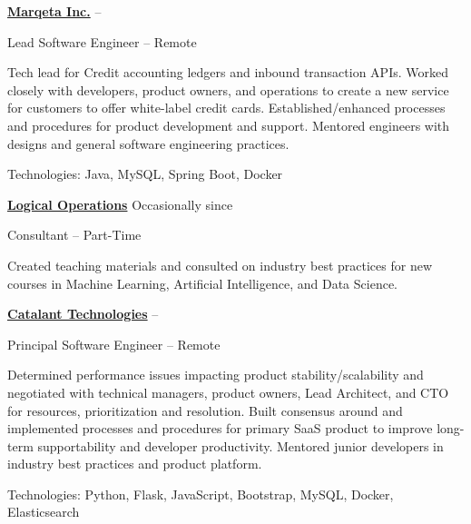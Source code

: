 \documentclass[letterpaper,MMMMyyyy,nonstopmode]{simpleresumecv}
\newif\ifLOCATION
\begin{document}
\begin{Body}
\BigGap
\Entry
\href{https://www.marqeta.com}
{\textbf{Marqeta Inc.}}
\hfill
 -- 

Lead Software Engineer -- Remote
\ifLOCATION
\hfill
Rochester, New York
\fi

\begin{Detail}
\BulletItem
Tech lead for Credit accounting ledgers and inbound transaction APIs.
Worked closely with developers, product owners, and operations to create a new service for customers to offer white-label credit cards. 
\BulletItem
Established/enhanced processes and procedures for product development and support.
\BulletItem
Mentored engineers with designs and general software engineering practices.

\Gap
Technologies: Java, MySQL, Spring Boot, Docker

\end{Detail}

\BigGap

\Entry
\href{http://logicalopertions.com/}
{\textbf{Logical Operations}}
\hfill
Occasionally since 

Consultant -- Part-Time
\ifLOCATION
\hfill 
Rochester, New York
\fi

\begin{Detail}
\BulletItem
Created teaching materials and consulted on industry best practices for new courses in Machine Learning, Artificial Intelligence, and Data Science.
\end{Detail}

\BigGap

\Entry
\href{http://www.gocatalant.com}
{\textbf{Catalant Technologies}}
\hfill
 -- 

Principal Software Engineer -- Remote
\ifLOCATION
\hfill
Rochester, New York
\fi

\begin{Detail}
\BulletItem
Determined performance issues impacting product stability/scalability and negotiated with technical managers, product owners, Lead Architect, and CTO for resources, prioritization and resolution.
\BulletItem
Built consensus around and implemented processes and procedures for primary SaaS product to improve long-term supportability and developer productivity.
\BulletItem
Mentored junior developers in industry best practices and product platform.

\Gap
Technologies: Python, Flask, JavaScript, Bootstrap, MySQL, Docker, Elasticsearch


\end{Detail}
\end{Body}
\end{document}
